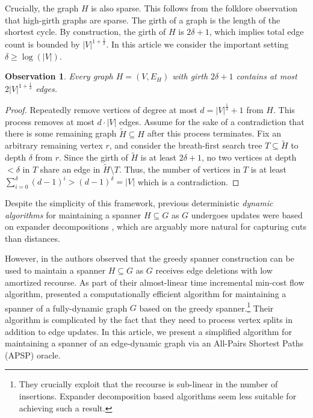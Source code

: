 \documentclass[11pt]{article}
\newtheorem{observation}[theorem]{Observation}
\renewcommand{\tilde}{\widetilde}
\begin{document}
Crucially, the graph $H$ is also sparse. This follows from the folklore observation that high-girth graphs are sparse. 
The girth of a graph is the length of the shortest cycle. By construction, the girth of $H$ is $2\delta + 1$, which implies total edge count is bounded by $|V|^{1 + \frac{1}{\delta}}$.
In this article we consider the important setting $\delta \geq \log(|V|)$.

\begin{observation} \label{obs:girth}
    Every graph $H = (V, E_H)$ with girth $2\delta + 1$ contains at most $2|V|^{1 + \frac{1}{\delta}}$ edges.
\end{observation}
\begin{proof}
    Repeatedly remove vertices of degree at most $d =  |V|^{ \frac{1}{\delta}} + 1$ from $H$. This process removes at most $d \cdot |V|$ edges. Assume for the sake of a contradiction that there is some remaining graph $\tilde{H} \subseteq H$ after this process terminates. Fix an arbitrary remaining vertex $r$, and consider the breath-first search tree $T \subseteq \tilde{H}$ to depth $\delta$ from $r$. Since the girth of $\tilde{H}$ is at least $2\delta + 1$, no two vertices at depth $< \delta$ in $T$ share an edge in $\tilde{H}\setminus T$. Thus, the number of vertices in $T$ is at least
        $\sum_{i = 0}^{\delta} (d-1)^i > (d-1)^\delta = |V|$
    which is a contradiction.
\end{proof}

Despite the simplicity of this framework, previous deterministic \emph{dynamic algorithms} for maintaining a spanner $H \subseteq G$ as $G$ undergoes updates were based on expander decompositions \cite{maxflow, detmax}, which are arguably more natural for capturing cuts than distances. 

However, in \cite{bhattacharya_et_al:LIPIcs.ESA.2022.17} the authors observed that the greedy spanner construction can be used to maintain a spanner $H \subseteq G$ as $G$ receives edge deletions with low amortized recourse. As part of their almost-linear time incremental min-cost flow algorithm, \cite{CKL24} presented a computationally efficient algorithm for maintaining a spanner of a fully-dynamic graph $G$ based on the greedy spanner.\footnote{They crucially exploit that the recourse is sub-linear in the number of insertions. Expander decomposition based algorithms seem less suitable for achieving such a result.} Their algorithm is complicated by the fact that they need to process vertex splits in addition to edge updates. In this article, we present a simplified algorithm for maintaining a spanner of an edge-dynamic graph via an All-Pairs Shortest Paths (APSP) oracle.
\end{document}
